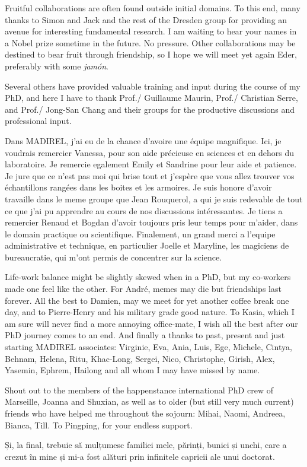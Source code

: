 Fruitful collaborations are often found outside initial domains. 
To this end, many thanks to Simon and Jack and the rest of the Dresden 
group for providing an avenue for interesting fundamental research.
I am waiting to hear your names in a Nobel prize sometime in the
future. No pressure. Other collaborations may be destined to bear fruit
through friendship, so I hope we will meet yet again Eder, preferably 
with some \textit{jamón}.

Several others have provided valuable training and input during the 
course of my PhD, and here I have to thank Prof./ Guillaume Maurin,
Prof./ Christian Serre, and Prof./ Jong-San Chang and their groups
for the productive discussions and professional input.

Dans MADIREL, j'ai eu de la chance d'avoire une équipe magnifique.
Ici, je voudrais remercier Vanessa, pour son aide précieuse en sciences
et en dehors du laboratoire.
Je remercie egalement Emily et Sandrine pour leur aide et patience.
Je jure que ce n'est pas moi qui brise tout et j'espère que vous allez
trouver vos échantillons  rangées dans les boites 
et les armoires. Je suis honore d'avoir travaille dans le meme groupe 
que Jean Rouquerol, a qui je suis redevable de tout ce que j'ai pu apprendre
au cours de nos discussions intéressantes. Je tiens a remercier 
Renaud et Bogdan d'avoir toujours pris leur temps pour m'aider,
dans le domain practique ou scientifique. 
Finalement, un grand merci a l'equipe administrative et technique,
en particulier Joelle et Maryline, les magiciens de bureaucratie, qui 
m'ont permis de concentrer sur la science.

Life-work balance might be slightly skewed when in a PhD, but my
co-workers made one feel like the other. For André, memes may die
but friendships last forever.
All the best to Damien, may we meet for yet another coffee break 
one day, and to Pierre-Henry and his military grade good nature.
To Kasia, which I am sure will never find a more annoying
office-mate, I wish all the best after our PhD journey comes to 
an end.
And finally a thanks to past, present and just starting MADIREL
associates: Virginie, Eva, Ania, Luis, Ege, Michele, Cintya, Behnam, Helena,
Ritu, Khac-Long, Sergei, Nico, Christophe, Girish, Alex, Yasemin, Ephrem, Hailong
and all whom I may have missed by name.

Shout out to the members of the happenstance international PhD crew of Marseille,
Joanna and Shuxian, as well as to older (but still very much current) friends
who have helped me throughout the sojourn: Mihai, Naomi, Andreea, Bianca, Till.
To Pingping, for your endless support. 

Și, la final, trebuie să mulțumesc familiei mele, părinți, bunici și 
unchi, care a crezut în mine și mi-a fost alături prin infinitele 
capricii ale unui doctorat.